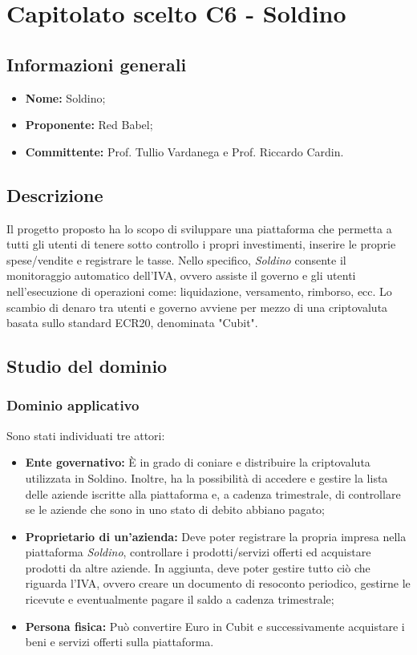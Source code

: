 \section{Capitolato scelto C6 - Soldino}
\subsection{Informazioni generali}
% 
\begin{itemize}
\item
\textbf{Nome:} Soldino;
\item
\textbf{Proponente:} Red Babel;
\item
\textbf{Committente:} Prof. Tullio Vardanega e Prof. Riccardo Cardin.
\end{itemize}

\subsection{Descrizione}
Il progetto proposto ha lo scopo di sviluppare una piattaforma che permetta a 
tutti gli utenti di tenere sotto controllo i propri investimenti, inserire le 
proprie spese/vendite e registrare le tasse. Nello specifico, \textit{Soldino} 
consente il monitoraggio automatico dell'IVA, ovvero assiste il governo e gli 
utenti nell'esecuzione di operazioni come: liquidazione, versamento, rimborso, 
ecc. Lo scambio di denaro tra utenti e governo avviene per mezzo di una 
criptovaluta basata sullo standard ECR20\glo{}, denominata "Cubit"\glo{}. 


\subsection{Studio del dominio}
\subsubsection{Dominio applicativo}
Sono stati individuati tre attori:
\begin{itemize}	
	\item \textbf{Ente governativo: }\`E in grado di coniare e distribuire la 
	criptovaluta utilizzata in Soldino. Inoltre, ha la possibilità di accedere e 
gestire la lista delle aziende iscritte alla piattaforma e, a cadenza 
trimestrale, di controllare se le aziende che sono in uno stato di debito 
abbiano pagato;
	\item \textbf{Proprietario di un'azienda:} Deve poter registrare la propria 
impresa nella piattaforma \textit{Soldino}, controllare i prodotti/servizi 
offerti ed acquistare 
prodotti da altre aziende. In aggiunta, deve poter gestire tutto ciò che 
riguarda l'IVA, ovvero creare un documento di resoconto periodico,
gestirne le ricevute e eventualmente pagare il saldo a cadenza trimestrale;
	\item \textbf{Persona fisica\glo: }Può convertire Euro in Cubit e 
successivamente acquistare i beni e servizi offerti sulla piattaforma. 
\end{itemize}
